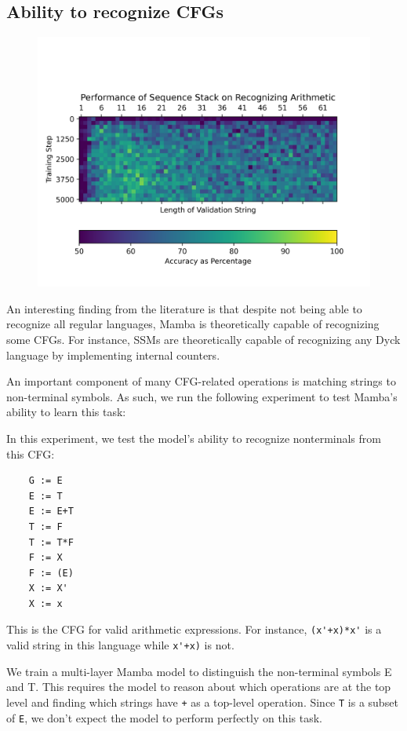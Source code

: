\subsection{Ability to recognize CFGs}
\begin{figure}
    \includegraphics[width=\textwidth]{figures/arithmetic.png}
    \caption{}
    \label{resultsarithmetic}
\end{figure}
An interesting finding from the literature is that despite not being able to
recognize all regular languages, Mamba is theoretically capable of recognizing
some CFGs. For instance, SSMs are theoretically capable of recognizing any Dyck
language by implementing internal counters\cite{ssmformal}.

An important component of many CFG-related operations is matching strings to
non-terminal symbols.
As such, we run the following experiment to test Mamba's ability to learn this
task:

In this experiment, we test the model's ability to recognize nonterminals from
this CFG:
\begin{verbatim}
    G := E
    E := T
    E := E+T
    T := F
    T := T*F
    F := X
    F := (E)
    X := X'
    X := x
\end{verbatim}
This is the CFG for valid arithmetic expressions.
For instance, \verb|(x'+x)*x'| is a valid string in this language while
\verb|x'+x)| is not.

We train a multi-layer Mamba model to distinguish the non-terminal symbols E and
T.
This requires the model to reason about which operations are at the top level
and finding which strings have \verb|+| as a top-level operation.
Since \verb|T| is a subset of \verb|E|, we don't expect the model to perform
perfectly on this task.


